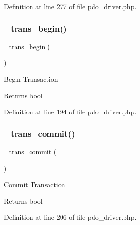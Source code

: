 Definition at line 277 of file pdo\+\_\+driver.\+php.

\mbox{\label{class_c_i___d_b__pdo__driver_ac81ac882c1d54347d810199a15856aac}} 
\subsubsection{\texorpdfstring{\_trans\_begin()}{\_trans\_begin()}}
{\footnotesize\ttfamily \+\_\+trans\+\_\+begin (\begin{DoxyParamCaption}{ }\end{DoxyParamCaption})\hspace{0.3cm}{\ttfamily [protected]}}

Begin Transaction

\begin{DoxyReturn}{Returns}
bool 
\end{DoxyReturn}


Definition at line 194 of file pdo\+\_\+driver.\+php.

\mbox{\label{class_c_i___d_b__pdo__driver_a6fe7f373e0b11cfae23a5f41c0b35dda}} 
\subsubsection{\texorpdfstring{\_trans\_commit()}{\_trans\_commit()}}
{\footnotesize\ttfamily \+\_\+trans\+\_\+commit (\begin{DoxyParamCaption}{ }\end{DoxyParamCaption})\hspace{0.3cm}{\ttfamily [protected]}}

Commit Transaction

\begin{DoxyReturn}{Returns}
bool 
\end{DoxyReturn}


Definition at line 206 of file pdo\+\_\+driver.\+php.

\mbox{\label{class_c_i___d_b__pdo__driver_ad49a116b0776c26b53114c9093fd102a}} 
